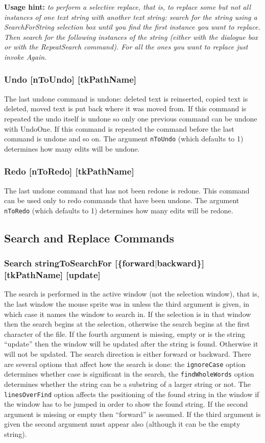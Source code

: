 {\bf Usage hint:} {\it to perform a selective replace, that is, to replace
some but not all instances of one text string with another text string:
search for the string using a SearchForString selection box until you
find the first instance you want to replace.
Then search for the following instances of the string
(either with the dialogue box or with the RepeatSearch command).
For all the ones you want to replace just invoke Again.}

\subsubsection{Undo [nToUndo] [tkPathName]}
The last undone command is undone:
deleted text is reinserted, copied text is deleted,
moved text is put back where it was moved from.
If this command is repeated the undo itself is undone
so only one previous command can be undone with UndoOne.
If this command is repeated the command before the last command
is undone and so on.
The argument {\tt nToUndo} (which defaults to 1) determines how
many edits will be undone.

\subsubsection{Redo [nToRedo] [tkPathName]}
The last undone command that has not been redone is redone.
This command can be used only to redo commands that have been undone.
The argument {\tt nToRedo} (which defaults to 1) determines how
many edits will be redone.




\subsection{Search and Replace Commands}

\subsubsection{Search stringToSearchFor
		[\{forward$\mid$backward\}] [tkPathName] [update]}
The search is performed in the active window
(not the selection window), that is, the
last window the mouse sprite was in unless the third
argument is given, in which case it names the window to search in.
If the selection is in that window then
the search begins at the selection, otherwise the search begins
at the first character of the file.
If the fourth argument is missing, empty or is the string ``update''
then the window will be updated after the string is found.
Otherwise it will not be updated.
The search direction is either forward or backward.
There are several options that affect how the search is done:
the {\tt ignoreCase} option determines whether case is significant
in the search, the {\tt findWholeWords} option determines whether
the string can be a substring of a larger string or not.
The {\tt linesOverFind} option affects the positioning of the found string
in the window if the window has to be jumped in order to show the
found string.
If the second argument is missing or empty then ``forward''
is assumed.
If the third argument is given the second argument must appear also
(although it can be the empty string).

